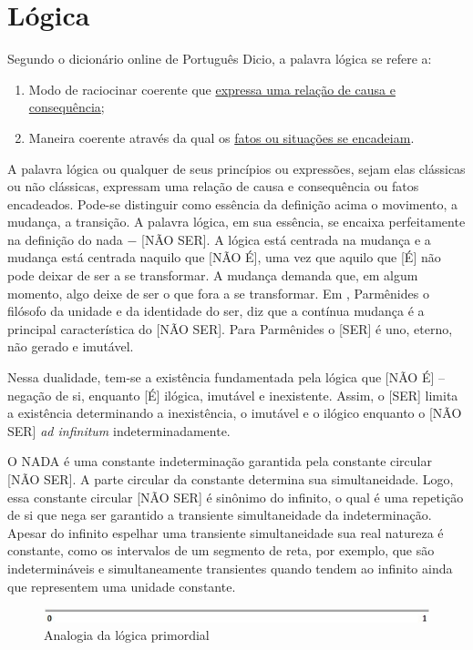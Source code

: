 \section{Lógica}
Segundo o dicionário online de Português Dicio\cite{dicio_logica}, a palavra lógica se refere a:
	\begin{enumerate}
	   \item Modo de raciocinar coerente que \underline{expressa uma relação de causa e consequência};
	   \item Maneira coerente através da qual os \underline{fatos ou situações se encadeiam}. 
	\end{enumerate}
 
\bigbreak
A palavra lógica ou qualquer de seus princípios ou expressões, sejam elas clássicas ou não clássicas, expressam uma relação de causa e consequência ou fatos encadeados. Pode-se distinguir como essência da definição acima o movimento, a mudança, a transição. A palavra lógica, em sua essência, se encaixa perfeitamente na definição do nada − [NÃO SER]. A lógica está centrada na mudança e a mudança está centrada naquilo que [NÃO É], uma vez que aquilo que [É] não pode deixar de ser a se transformar. A mudança demanda que, em algum momento, algo deixe de ser o que fora a se transformar. Em , Parmênides  o filósofo da unidade e da identidade do ser, diz que a contínua mudança é a principal característica do [NÃO SER]. Para Parmênides o [SER] é uno, eterno, não gerado e imutável.

Nessa dualidade, tem-se a existência fundamentada pela lógica que [NÃO É] – negação de si, enquanto [É] ilógica, imutável e inexistente. Assim, o [SER] limita a existência determinando a inexistência, o imutável e o ilógico enquanto o [NÃO SER] \textit{ad infinitum} indeterminadamente.
	
O NADA é uma constante indeterminação garantida pela constante circular [NÃO SER]. A parte circular da constante determina sua simultaneidade. Logo, essa constante circular [NÃO SER] é sinônimo do infinito, o qual é uma repetição de si que nega ser garantido a transiente simultaneidade da indeterminação. Apesar do infinito espelhar uma transiente simultaneidade sua real natureza é constante, como os intervalos de um segmento de reta, por exemplo, que são indetermináveis e simultaneamente transientes quando tendem ao infinito ainda que representem uma unidade constante.	
	\begin{figure}[H]
	\caption{Analogia da lógica primordial}
	\label{fig:primordial_logic_representation}
	\centering
	\includegraphics[scale=.9]{sections/images/primordial_logic_representation.jpg}
	\end{figure}

